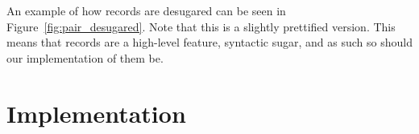 An example of how records are desugared can be seen in
Figure~\ref{fig:pair_desugared}. Note that this is a slightly prettified
version. This means that records are a high-level feature, syntactic sugar, and
as such so should our implementation of them be.

\section{Implementation}




